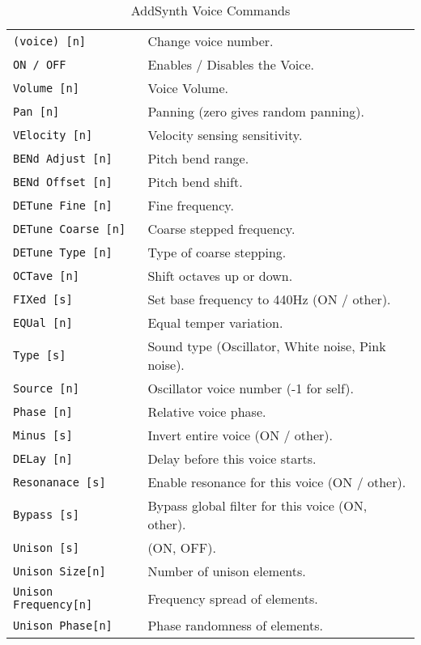    \begin{table}[H]
      \caption{AddSynth Voice Commands}
      \label{table:yoshimi_part_addsynth_voice_commands}
      \begin{tabular}{l l}
\texttt{(voice) [n]} &
   Change voice number.  \\
\texttt{ON / OFF} &
   Enables / Disables the Voice. \\
\texttt{Volume [n]} &
   Voice Volume.  \\
\texttt{Pan [n]} &
   Panning (zero gives random panning).\\
\texttt{VElocity [n]} &
   Velocity sensing sensitivity. \\
\texttt{BENd Adjust [n]} &
   Pitch bend range. \\
\texttt{BENd Offset [n]} &
   Pitch bend shift. \\
\texttt{DETune Fine [n]} &
   Fine frequency.   \\
\texttt{DETune Coarse [n]} &
   Coarse stepped frequency.  \\
\texttt{DETune Type [n]} &
   Type of coarse stepping.   \\
\texttt{OCTave [n]} &
   Shift octaves up or down.  \\
\texttt{FIXed [s]} &
   Set base frequency to 440Hz (ON / other).  \\
\texttt{EQUal [n]} &
   Equal temper variation. \\
\texttt{Type [s]} &
   Sound type (Oscillator, White noise, Pink noise). \\
\texttt{Source [n]} &
   Oscillator voice number (-1 for self). \\
\texttt{Phase [n]} &
   Relative voice phase. \\
\texttt{Minus [s]} &
   Invert entire voice (ON / other). \\
\texttt{DELay [n]} &
   Delay before this voice starts. \\
\texttt{Resonanace [s]} &
   Enable resonance for this voice (ON / other). \\
\texttt{Bypass [s]} &
   Bypass global filter for this voice (ON, {other}). \\
\texttt{Unison [s]} &
   (ON, OFF). \\
\texttt{Unison Size[n]} &
   Number of unison elements. \\
\texttt{Unison Frequency[n]} &
   Frequency spread of elements. \\
\texttt{Unison Phase[n]} &
   Phase randomness of elements. \\

\end{tabular}
\end{table}
